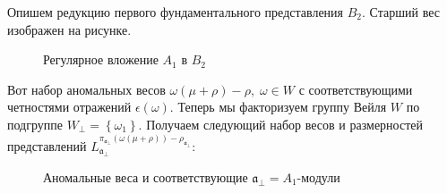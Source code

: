 \documentclass[a4paper,12pt]{article}
\theoremstyle{definition} \newtheorem{Def}{Definition}
\begin{document}
Опишем редукцию первого фундаментального представления $B_2$. Старший вес изображен на рисунке.
\begin{figure}[ph]
  \noindent{}
  \caption{Регулярное вложение $A_1$ в $B_2$}
  \label{fig:B2_A1}
\end{figure}
Вот набор аномальных весов $\omega(\mu+\rho)-\rho,\; \omega\in W$ с соответствующими четностями
отражений $\epsilon(\omega)$.
Теперь мы факторизуем группу Вейля $W$ по подгруппе $W_{\bot}=\left\{\omega_1\right\}$. Получаем
следующий набор весов и размерностей представлений  $L^{\pi_{\mathfrak{a}_{\bot}}(\omega(\mu+\rho))-\rho_{\mathfrak{a}_{\bot}}}_{\mathfrak{a}_{\bot}}$:
\begin{figure}[h!tb]
  \noindent{}
  \caption{Аномальные веса и соответствующие $\mathfrak{a}_{\bot}=A_1$-модули}
  \label{fig:B2_A1_2}
\end{figure}
\end{document}

